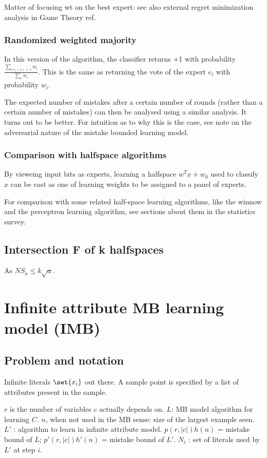\documentclass[oneside, article]{memoir}
\begin{document}
Matter of focusing wt on the best expert: see also external regret minimization analysis in Game Theory ref.

\subsubsection{Randomized weighted majority}
In this version of the algorithm, the classifier returns +1 with probability $\frac{\sum_{i: e_i(x) = 1} w_i}{\sum_i w_i}$. This is the same as returning the vote of the expert $e_i$ with probability $w_i$.

The expected number of mistakes after a certain number of rounds (rather than a certain number of mistakes) can then be analysed using a similar analysis. It turns out to be better. For intuition as to why this is the case, see note on the adversarial nature of the mistake bounded learning model.

\subsubsection{Comparison with halfspace algorithms}
By vieweing input bits as experts, learning a halfspace $w^{T}x + w_0$ used to classify $x$ can be cast as one of learning weights to be assigned to a panel of experts.

For comparison with some related half-space learning algorithms, like the winnow and the perceptron learning algorithm, see sections about them in the statistics survey.

\subsection{Intersection F of k halfspaces}
As $NS_{a} \leq k \sqrt{a}$. \why

\section{Infinite attribute MB learning model (IMB)}
\subsection{Problem and notation}
Infinite literals $\set{x_{i}}$ out there. A sample point is specified by a list of attributes present in the sample.

$r$ is the number of variables $c$ actually depends on. $L$: MB model algorithm for learning $C$. $n$, when not used in the MB sense: size of the largest example seen. $L'$ : algorithm to learn in infinite attribute model. $p(r, |c|)h(n)$ = mistake bound of $L$; $p'(r, |c|)h'(n)$ = mistake bound of $L'$. $N_{i}$ : set of literals used by $L'$  at step $i$.
\end{document}
